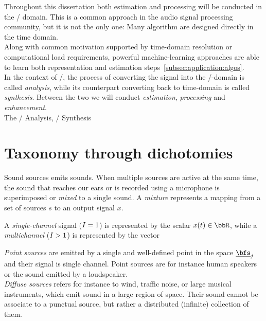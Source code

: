 Throughout this dissertation both estimation and processing will be conducted in the  \TF/ domain.
This is a common approach in the audio signal processing community, but it is not the only one:
Many algorithm are designed directly in the time domain.
\\Along with common motivation supported by time-domain resolution or computational load requirements,
powerful machine-learning approaches are able to learn both representation and estimation steps~\cref{subsec:application:algos}.
\\In the context of \STFT/, the process of converting the signal into the \TF/-domain is called \textit{analysis}, while
its counterpart converting back to time-domain is called \textit{synthesis}.
Between the two we will conduct \textit{estimation}, \textit{processing} and \textit{enhancement}.
\\The \STFT/ Analysis, \STFT/ Synthesis

\section{Taxonomy through dichotomies}
\cite{vincent2018audio}

Sound sources emits sounds.
When multiple sources are active at the same time, the sound that reaches our ears or is recorded using a microphone is superimposed or \textit{mixed} to a single sound.
A \textit{mixture} represents a mapping from a set of sources $s$ to an output signal $x$.

A \textit{single-channel} signal ($I = 1$) is represented by the scalar $\mic(t) \in \R$,
while a \textit{multichannel} ($I >   1$) is represented by the vector

\textit{Point sources} are emitted by a single and well-defined point in the space $\positionSource_\idxSrc$ and their signal is single channel.
Point sources are for instance human speakers or the sound emitted by a loudspeaker.
\\\textit{Diffuse sources} refers for instance to wind, traffic noise, or large musical instruments, which emit sound in a large region of space.
Their sound cannot be associate to a punctual source, but rather a distributed (infinite) collection of them.

